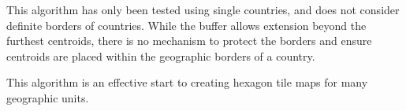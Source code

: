This algorithm has only been tested using single countries, and does not
consider definite borders of countries. While the buffer allows
extension beyond the furthest centroids, there is no mechanism to
protect the borders and ensure centroids are placed within the
geographic borders of a country.

This algorithm is an effective start to creating hexagon tile maps for
many geographic units.



\address{%
Stephanie Kobakian\\
Monash University\\%
Department of Econometrics and Business Statistics\\
%
%
%
\\\href{mailto:stephanie.kobakian@monash.edu}{\nolinkurl{stephanie.kobakian@monash.edu}}
}

\address{%
Dianne Cook\\
Monash University\\%
Department of Econometrics and Business Statistics\\
%
%
%
\\\href{mailto:dicook@monash.edu}{\nolinkurl{dicook@monash.edu}}
}


